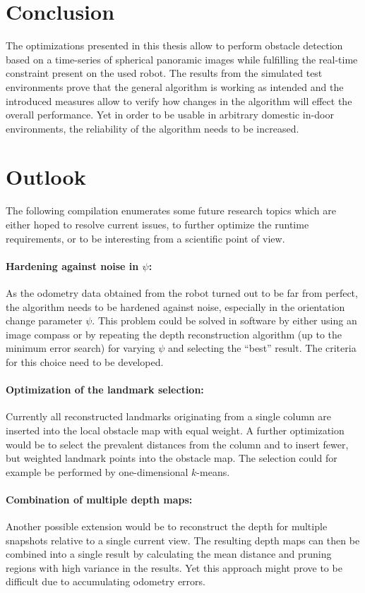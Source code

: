 \section{Conclusion}

The optimizations presented in this thesis allow to perform obstacle detection based on a time-series of spherical panoramic images while fulfilling the real-time constraint present on the used robot. The results from the simulated test environments prove that the general algorithm is working as intended and the introduced measures allow to verify how changes in the algorithm will effect the overall performance. Yet in order to be usable in arbitrary domestic in-door environments, the reliability of the algorithm needs to be increased.

\section{Outlook}

The following compilation enumerates some future research topics which are either hoped to resolve current issues, to further optimize the runtime requirements, or to be interesting from a scientific point of view.

\paragraph{Hardening against noise in $\psi$:} As the odometry data obtained from the robot turned out to be far from perfect, the algorithm needs to be hardened against noise, especially in the orientation change parameter $\psi$. This problem could be solved in software by either using an image compass or by repeating the depth reconstruction algorithm (up to the minimum error search) for varying $\psi$ and selecting the ``best'' result. The criteria for this choice need to be developed.

\paragraph{Optimization of the landmark selection:} Currently all reconstructed landmarks originating from a single column are inserted into the local obstacle map with equal weight. A further optimization would be to select the prevalent distances from the column and to insert fewer, but weighted landmark points into the obstacle map. The selection could for example be performed by one-dimensional $k$-means.

\paragraph{Combination of multiple depth maps:} Another possible extension would be to reconstruct the depth for multiple snapshots relative to a single current view. The resulting depth maps can then be combined into a single result by calculating the mean distance and pruning regions with high variance in the results. Yet this approach might prove to be difficult due to accumulating odometry errors.

